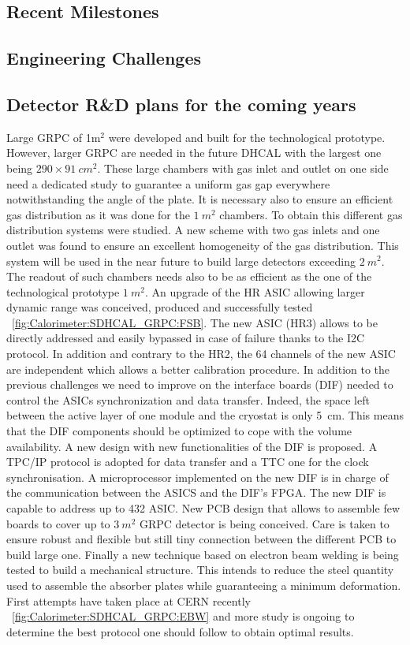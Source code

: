\subsection{Recent Milestones}

\subsection{Engineering Challenges}
\subsection{Detector R\&D plans for the coming years}

Large GRPC of 1m$^2$ were developed and built for the technological prototype.
However, larger GRPC are needed in the future DHCAL with the largest one being
$290\times \SI{91}{cm^2}$. These large chambers with gas inlet and outlet on one side need a
dedicated study to guarantee a uniform gas gap everywhere notwithstanding the
angle of the plate. It is necessary also to ensure an efficient gas distribution
as it was done for the $\SI{1}{m^2}$ chambers. To obtain this different gas distribution
systems were studied. A new scheme with two gas inlets and one outlet was found
to ensure an excellent homogeneity of the gas distribution. This system will be
used in the near future to build large detectors exceeding $\SI{2}{m^2}$. The readout
of such chambers needs also to be as efficient as the one of the technological
prototype $\SI{1}{m^2}$. An upgrade of the HR ASIC allowing larger dynamic range was
conceived, produced and successfully tested ~\ref{fig:Calorimeter:SDHCAL_GRPC:FSB}. The new ASIC (HR3)
allows to be directly addressed and easily bypassed in case of failure thanks to
the I2C protocol. In addition and contrary to the HR2, the 64 channels of the
new ASIC are independent which allows a better calibration procedure. In
addition to the previous challenges we need to improve on the interface boards
(DIF) needed to control the ASICs synchronization and data transfer. Indeed, the
space left between the active layer of one module and the cryostat is only \SI{5}{cm}.
This means that the DIF components should be optimized to cope with the volume
availability. A new design with new functionalities of the DIF is proposed. A
TPC/IP protocol is adopted for data transfer and a TTC one for the clock
synchronisation. A microprocessor implemented on the new DIF is in charge of
the communication between the ASICS and the DIF's FPGA. The new DIF is capable
to address up to 432 ASIC. New PCB design that allows to assemble few boards to
cover up to $\SI{3}{m^2}$ GRPC detector is being conceived. Care is taken to ensure
robust and flexible but still tiny connection between the different PCB to build
large one. Finally a new technique based on electron beam welding is being
tested to build a mechanical structure. This intends to reduce the steel
quantity used to assemble the absorber plates while guaranteeing a minimum
deformation. First attempts have taken place at CERN recently ~\ref{fig:Calorimeter:SDHCAL_GRPC:EBW} and
more study is ongoing to determine the best protocol one should follow to obtain
optimal results.


